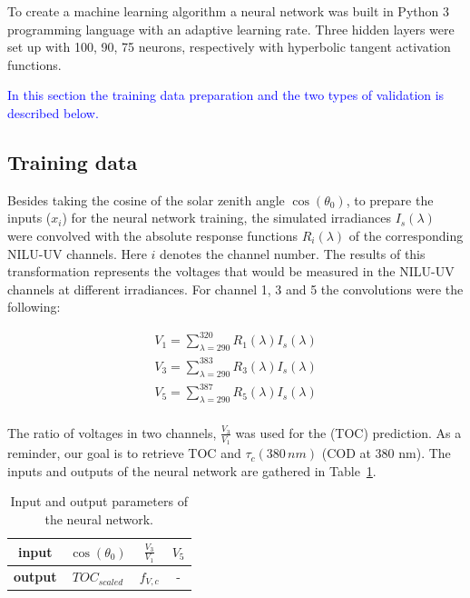 \documentclass{optica-article}
\begin{document}
To create a machine learning algorithm a neural network was built in Python 3 programming language with an adaptive learning rate.
Three hidden layers were set up with 100, 90, 75 neurons, respectively with hyperbolic tangent activation functions.

\textcolor{blue}{In this section the training data preparation and the two types of validation is described below.}

\subsection{Training data}

Besides taking the cosine of the solar zenith angle $\cos(\theta_0)$, to prepare the inputs ($x_i$) for the neural network training, the simulated irradiances $I_s(\lambda)$  were convolved with the absolute response functions $R_i(\lambda)$ of the corresponding NILU-UV channels.
Here $i$ denotes the channel number. 
The results of this transformation represents the voltages that would be measured in the NILU-UV channels at different irradiances.   
For channel 1, 3 and 5 the convolutions were the following:

\begin{equation}
	\begin{split}
		V_1 = \sum_{\lambda = 290}^{320}R_1(\lambda)I_s(\lambda) \\
		V_3 = \sum_{\lambda = 290}^{383}R_3(\lambda)I_s(\lambda) \\
		V_5 = \sum_{\lambda = 290}^{387}R_5(\lambda)I_s(\lambda) \\
	\end{split}
\end{equation}

The ratio of voltages in two channels, $\frac{V_3}{V_1}$  was used for the (TOC) prediction. 
As a reminder, our goal is to retrieve TOC and $\tau_c{\scriptstyle(380 \, nm)}$ (COD at 380 nm). 
The inputs and outputs of the neural network are gathered in {Table~\ref{tab:nn_inputs}}.

\begin{table}[H]	
	\centering
	\begin{tabular}{c|c|c|c}
		\textbf{input} & $\cos(\theta_0)$ &  $\frac{V_3}{V_1}$ & $V_5$ \\
		\hline
		\textbf{output} & $TOC_{scaled}$ & $f_{V,c}$ & - \\
	\end{tabular}
	\caption{Input and output parameters of the neural network.}
	\label{tab:nn_inputs}
\end{table}
\end{document}
